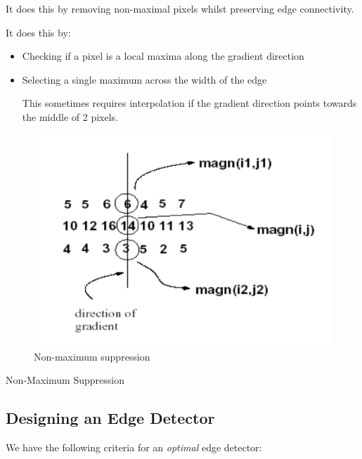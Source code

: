 \documentclass{article}
\begin{document}
It does this by removing non-maximal pixels whilst preserving edge connectivity.

It does this by:

\begin{itemize}
  \item Checking if a pixel is a local maxima along the gradient direction
  \item Selecting a single maximum across the width of the edge

        This sometimes requires interpolation if the gradient direction points towards the middle of 2 pixels.
\end{itemize}


\label{sssec:non-max}

\begin{figure}[ht]
  \centering
  \includegraphics[scale=0.5]{figures/l3-2.png}
  \caption{\label{fig:non-max} Non-maximum suppression}
\end{figure}


\begin{algorithm}
  \caption{Non-Maximum Suppression}
\end{algorithm}
\subsection{Designing an Edge Detector}

We have the following criteria for an \textit{optimal} edge detector:
\end{document}
